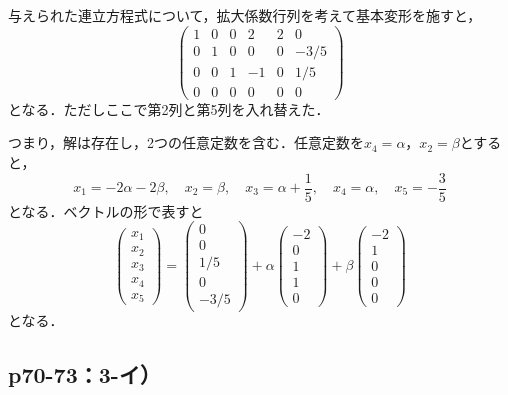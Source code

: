\documentclass[uplatex,dvipdfmx,a4paper,10pt,fleqn]{jsarticle}
\begin{document}
\begin{tleftbar}
    与えられた連立方程式について，拡大係数行列を考えて基本変形を施すと，
    \[
        \begin{pmatrix} 1 & 0 & 0 & 2 & 2 & 0 \\ 0 & 1& 0 & 0 & 0 & -3/5 \\ 0 & 0 & 1 & -1 & 0 & 1/5 \\ 0 & 0 & 0 & 0 & 0 & 0 \end{pmatrix}
    \]
    となる．ただしここで第2列と第5列を入れ替えた．

    つまり，解は存在し，2つの任意定数を含む．任意定数を$x_4 = \alpha$，$x_2 = \beta $とすると，
    \[
        x_1 = -2 \alpha - 2 \beta , \quad x_2 =\beta , \quad x_3 = \alpha + \frac{1}{5} , \quad x_4 = \alpha , \quad x_5 = -\frac{3}{5}
    \]
    となる．ベクトルの形で表すと
    \[
        \begin{pmatrix} x_1 \\ x_2 \\ x_3 \\ x_4 \\ x_5 \end{pmatrix}= \begin{pmatrix} 0 \\ 0 \\ 1/5 \\ 0 \\ -3/5 \end{pmatrix} + \alpha \begin{pmatrix} -2 \\ 0 \\ 1 \\ 1 \\ 0 \end{pmatrix} + \beta \begin{pmatrix} -2 \\ 1 \\ 0 \\ 0 \\ 0 \end{pmatrix}
    \]
    となる．
\end{tleftbar}


\newpage
    \subsection*{p70-73：3-イ）}
\end{document}
